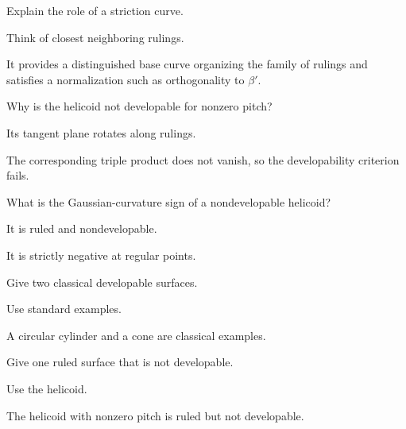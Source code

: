 \begin{exercise}\label{exr:vii18-18}
Explain the role of a striction curve.
\end{exercise}
\begin{hint}
Think of closest neighboring rulings.
\end{hint}
\begin{solution}
It provides a distinguished base curve organizing the family of rulings and satisfies a normalization such as orthogonality to \(\beta'\).
\end{solution}

\begin{exercise}\label{exr:vii18-19}
Why is the helicoid not developable for nonzero pitch?
\end{exercise}
\begin{hint}
Its tangent plane rotates along rulings.
\end{hint}
\begin{solution}
The corresponding triple product does not vanish, so the developability criterion fails.
\end{solution}

\begin{exercise}\label{exr:vii18-20}
What is the Gaussian-curvature sign of a nondevelopable helicoid?
\end{exercise}
\begin{hint}
It is ruled and nondevelopable.
\end{hint}
\begin{solution}
It is strictly negative at regular points.
\end{solution}

\begin{exercise}\label{exr:vii18-21}
Give two classical developable surfaces.
\end{exercise}
\begin{hint}
Use standard examples.
\end{hint}
\begin{solution}
A circular cylinder and a cone are classical examples.
\end{solution}

\begin{exercise}\label{exr:vii18-22}
Give one ruled surface that is not developable.
\end{exercise}
\begin{hint}
Use the helicoid.
\end{hint}
\begin{solution}
The helicoid with nonzero pitch is ruled but not developable.
\end{solution}

